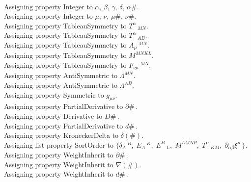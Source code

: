 \documentclass[11pt]{article}
\begin{document}
\\
Assigning property Integer to $\alpha$, $\beta$, $\gamma$, $\delta$, $\alpha\#$.
\\
Assigning property Integer to $\mu$, $\nu$, $\mu\#$, $\nu\#$.
\\
Assigning property TableauSymmetry to ${T}^{\alpha}\,_{M N}$.
\\
Assigning property TableauSymmetry to ${T}^{\alpha}\,_{A B}$.
\\
Assigning property TableauSymmetry to ${A}_{\mu}\,^{M N}$.
\\
Assigning property TableauSymmetry to ${M}^{M N K L}$.
\\
Assigning property TableauSymmetry to ${F}_{\nu \mu}\,^{M N}$.
\\
Assigning property AntiSymmetric to ${\Lambda}^{M N}$.
\\
Assigning property AntiSymmetric to ${\Lambda}^{A B}$.
\\
Assigning property Symmetric to ${g}_{\mu \nu}$.
\\
Assigning property PartialDerivative to $\partial{\#}\, $.
\\
Assigning property Derivative to $D{\#}\, $.
\\
Assigning property PartialDerivative to $d{\#}\, $.
\\
Assigning property KroneckerDelta to $\delta(\#)$.
\\
Assigning list property SortOrder to $\{{\delta}_{A}\,^{B},\; {E}_{A}\,^{K},\; {E}^{B}\,_{L},\; {M}^{L M N P},\; {T}^{\alpha}\,_{K M},\; {\partial}_{\alpha \beta}{{\xi}^{\mu}}\, \}$.
\\
Assigning property WeightInherit to $\partial{\#}\, $.
\\
Assigning property WeightInherit to $\nabla(\#)$.
\\
Assigning property WeightInherit to $d{\#}\, $.
\end{document}
